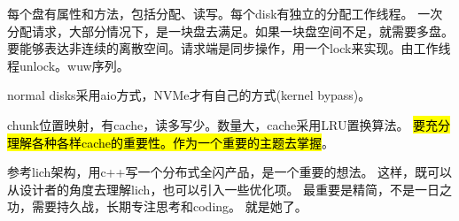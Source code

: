 每个盘有属性和方法，包括分配、读写。每个disk有独立的分配工作线程。
一次分配请求，大部分情况下，是一块盘去满足。如果一块盘空间不足，就需要多盘。
要能够表达非连续的离散空间。请求端是同步操作，用一个lock来实现。由工作线程unlock。wuw序列。

normal disks采用aio方式，NVMe才有自己的方式(kernel bypass)。

chunk位置映射，有cache，读多写少。数量大，cache采用LRU置换算法。
\hl{要充分理解各种各样cache的重要性。作为一个重要的主题去掌握}。

参考lich架构，用c++写一个分布式全闪产品，是一个重要的想法。
这样，既可以从设计者的角度去理解lich，也可以引入一些优化项。
最重要是精简，不是一日之功，需要持久战，长期专注思考和coding。
就是她了。
